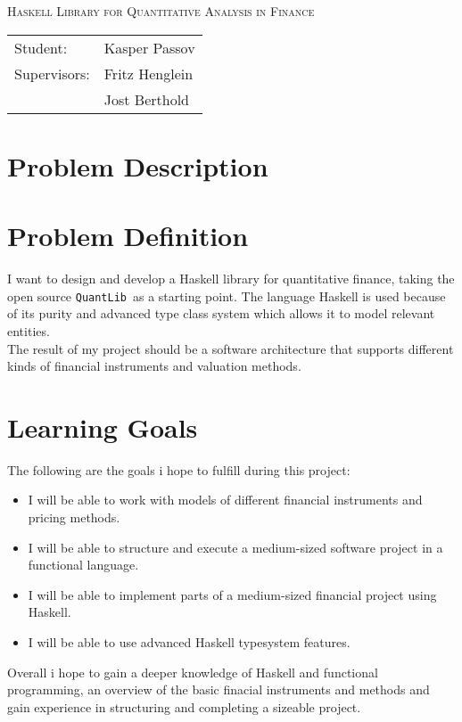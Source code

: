 \documentclass{article}
\newcommand{\QL}{\texttt{QuantLib}}
\theoremstyle{definition}
\begin{document}
\begin{titlepage}
\begin{center}
\textsc{\huge Haskell Library for Quantitative Analysis in Finance}\\[0.5cm]
\vspace{2 cm}
\begin{tabular}{ll}
Student: & Kasper Passov\\
Supervisors: & Fritz Henglein \\ 
             & Jost Berthold
\end{tabular}
\end{center}
\vspace{5 cm}
\newpage
\tableofcontents
\end{titlepage}

\section{Problem Description}

\section{Problem Definition}

I want to design and develop a Haskell library for 
quantitative finance, taking the open source \QL\ 
as a starting point. The language Haskell is used
because of its purity and advanced type class system
which allows it to model relevant entities.\\
The result of my project should be a software
architecture that supports different kinds of 
financial instruments and valuation methods.

\section{Learning Goals}
The following are the goals i hope to fulfill during this project:
\begin{itemize}
    \item {I will be able to work with models of different financial instruments and pricing methods.}
    \item {I will be able to structure and execute a medium-sized software project in a functional language.}
    \item {I will be able to implement parts of a medium-sized financial project using Haskell.}
    \item {I will be able to use advanced Haskell typesystem features.}
\end{itemize}
Overall i hope to gain a deeper knowledge of Haskell and functional programming, an overview of the basic finacial instruments
and methods and gain experience in structuring and completing a sizeable project.
\end{document}
